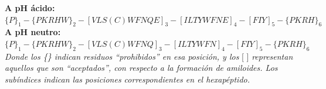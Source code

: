 \noindent \textbf{A pH ácido:} $\{P\}_1 -\{PKRHW\}_2 -[VLS(C)WFNQE]_3 -[ILTYWFNE]_4 -[FIY]_5- \{PKRH\}_6 $\\
\noindent \textbf{A pH neutro:}  $\{P\}_1 -\{PKRHW\}_2 -[VLS(C)WFNQ]_3 -[ILTYWFN]_4 -[FIY]_5- \{PKRH\}_6 $\\
\textit{\noindent Donde los \{\} indican residuos ``prohibidos'' en esa posición, y los} [ ] \textit{representan aquellos que son ``aceptados'', con respecto a la formación de amiloides.
Los subíndices indican las posiciones correspondientes en el hexapéptido.}

\vspace{0.2cm}
% 






